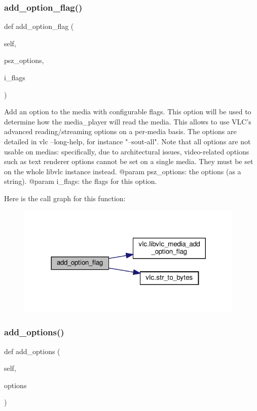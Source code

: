 \subsubsection{\texorpdfstring{add\+\_\+option\+\_\+flag()}{add\_option\_flag()}}
{\footnotesize\ttfamily def add\+\_\+option\+\_\+flag (\begin{DoxyParamCaption}\item[{}]{self,  }\item[{}]{psz\+\_\+options,  }\item[{}]{i\+\_\+flags }\end{DoxyParamCaption})}

\begin{DoxyVerb}Add an option to the media with configurable flags.
This option will be used to determine how the media_player will
read the media. This allows to use VLC's advanced
reading/streaming options on a per-media basis.
The options are detailed in vlc --long-help, for instance
"--sout-all". Note that all options are not usable on medias:
specifically, due to architectural issues, video-related options
such as text renderer options cannot be set on a single media. They
must be set on the whole libvlc instance instead.
@param psz_options: the options (as a string).
@param i_flags: the flags for this option.
\end{DoxyVerb}
 Here is the call graph for this function\+:
\nopagebreak
\begin{figure}[H]
\begin{center}
\leavevmode
\includegraphics[width=308pt]{classvlc_1_1_media_acac9b8f87cc487439af1e94a5cfb60ae_cgraph}
\end{center}
\end{figure}
\mbox{\label{classvlc_1_1_media_afc1d9bd3735629f1ffba0c9c18c9306c}} 
\subsubsection{\texorpdfstring{add\+\_\+options()}{add\_options()}}
{\footnotesize\ttfamily def add\+\_\+options (\begin{DoxyParamCaption}\item[{}]{self,  }\item[{}]{options }\end{DoxyParamCaption})}

